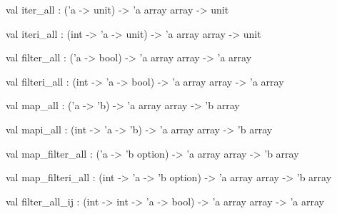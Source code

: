 \documentclass[11pt]{article}
\begin{document}
\begin{ocamldocsigend}
\label{val:Util.A.iter-underscoreall}\begin{ocamldoccode}
val iter_all : ('a -> unit) -> 'a array array -> unit
\end{ocamldoccode}


\label{val:Util.A.iteri-underscoreall}\begin{ocamldoccode}
val iteri_all : (int -> 'a -> unit) -> 'a array array -> unit
\end{ocamldoccode}


\label{val:Util.A.filter-underscoreall}\begin{ocamldoccode}
val filter_all : ('a -> bool) -> 'a array array -> 'a array
\end{ocamldoccode}


\label{val:Util.A.filteri-underscoreall}\begin{ocamldoccode}
val filteri_all : (int -> 'a -> bool) -> 'a array array -> 'a array
\end{ocamldoccode}


\label{val:Util.A.map-underscoreall}\begin{ocamldoccode}
val map_all : ('a -> 'b) -> 'a array array -> 'b array
\end{ocamldoccode}


\label{val:Util.A.mapi-underscoreall}\begin{ocamldoccode}
val mapi_all : (int -> 'a -> 'b) -> 'a array array -> 'b array
\end{ocamldoccode}


\label{val:Util.A.map-underscorefilter-underscoreall}\begin{ocamldoccode}
val map_filter_all : ('a -> 'b option) -> 'a array array -> 'b array
\end{ocamldoccode}


\label{val:Util.A.map-underscorefilteri-underscoreall}\begin{ocamldoccode}
val map_filteri_all : (int -> 'a -> 'b option) -> 'a array array -> 'b array
\end{ocamldoccode}


\label{val:Util.A.filter-underscoreall-underscoreij}\begin{ocamldoccode}
val filter_all_ij : (int -> int -> 'a -> bool) -> 'a array array -> 'a array
\end{ocamldoccode}



\end{ocamldocsigend}
\end{document}
